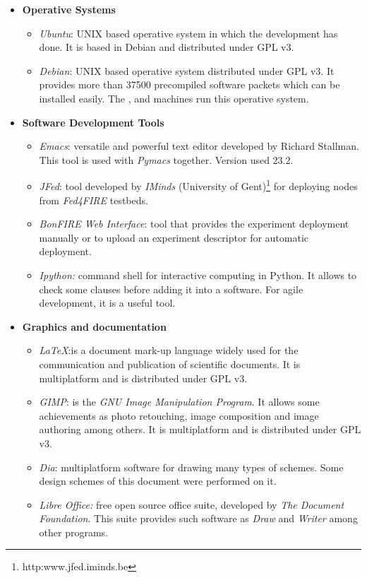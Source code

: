 \begin{itemize}
\item \textbf{Operative Systems}
\begin{itemize}
\item{\emph{Ubuntu}}: UNIX based operative system in which the development has done. It
  is based in Debian and distributed under \ac{GPL} v3.
\item{\emph{Debian}}: UNIX based operative system distributed under \ac{GPL}
  v3. It provides more than 37500 precompiled software packets which can be
  installed easily. The \bonfire, \vw and \pl machines run this operative system.
\end{itemize}
\item \textbf{Software Development Tools}

\begin{itemize}
\item{\emph{Emacs}}: versatile and powerful text editor developed by Richard
  Stallman. This tool is used with \emph{Pymacs} together. Version used 23.2.
\item{\emph{JFed}}: tool developed by \emph{IMinds} (University of
  Gent)\footnote{http:www.jfed.iminds.be} for deploying nodes from
  \emph{Fed4FIRE} testbeds. 
\item{\emph{BonFIRE Web Interface}}: \bonfire tool that provides the experiment
  deployment manually or to upload an experiment descriptor for automatic
  deployment.
\item \emph{Ipython:}  command shell for interactive computing in Python. It
  allows to check some clauses before adding it into a software. For agile
  development, it is a useful tool. 
\end{itemize}


\item \textbf{Graphics and documentation}

\begin{itemize}
\item{\emph{\LaTeX}}:is a document mark-up language widely used for the
  communication and publication of scientific documents. It is multiplatform and is distributed under \ac{GPL} v3.
\item{\emph{GIMP}}: is the \emph{GNU Image Manipulation Program}. It allows some
  achievements as photo retouching, image composition and image authoring among
  others. It is multiplatform and is distributed under \ac{GPL} v3.
\item{\emph{Dia}}: multiplatform software for drawing many types of
  schemes. Some design schemes of this document were performed on it.
\item \emph{Libre Office:} free open source office suite, developed by \emph{The
      Document Foundation}. This suite provides such software as \emph{Draw} and
    \emph{Writer} among other programs. 
\end{itemize}


\end{itemize}

